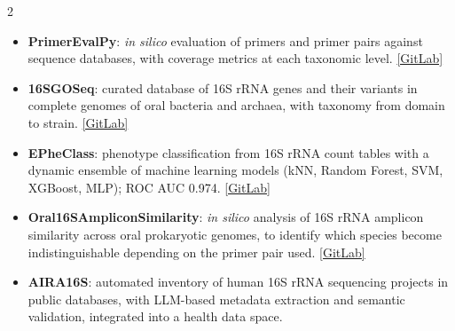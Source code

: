 \documentclass[10pt, a4paper]{article}
\newcommand{\mainsection}[1]{%
  \vspace{9pt}{\large\bfseries\color{accent}#1}\par
  \vspace{2pt}{\color{rulegray}\hrule}\vspace{5pt}}
\begin{document}
\begin{paracol}{2}
\mainsection{Software}
\begin{itemize}[itemsep=3pt]
  \item \textbf{PrimerEvalPy}: \textit{in silico} evaluation of primers and primer pairs against sequence databases, with coverage metrics at each taxonomic level. \href{https://gitlab.citius.gal/lara.vazquez/PrimerEvalPy}{\small [GitLab]}
  \item \textbf{16SGOSeq}: curated database of 16S rRNA genes and their variants in complete genomes of oral bacteria and archaea, with taxonomy from domain to strain. \href{https://gitlab.citius.gal/lara.vazquez/16sgoseq}{\small [GitLab]}
  \item \textbf{EPheClass}: phenotype classification from 16S rRNA count tables with a dynamic ensemble of machine learning models (kNN, Random Forest, SVM, XGBoost, MLP); ROC AUC 0.974. \href{https://gitlab.citius.gal/lara.vazquez/epheclass}{\small [GitLab]}
  \item \textbf{Oral16SAmpliconSimilarity}: \textit{in silico} analysis of 16S rRNA amplicon similarity across oral prokaryotic genomes, to identify which species become indistinguishable depending on the primer pair used. \href{https://gitlab.citius.gal/lara.vazquez/oral16sampliconsimilarity}{\small [GitLab]}
  \item \textbf{AIRA16S}: automated inventory of human 16S rRNA sequencing projects in public databases, with LLM-based metadata extraction and semantic validation, integrated into a health data space.
\end{itemize}


\end{paracol}
\end{document}
